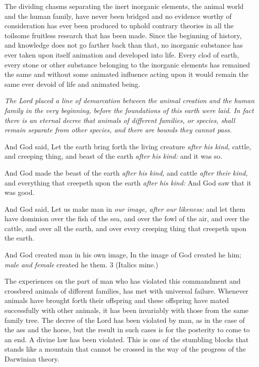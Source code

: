 The dividing chasms separating the inert inorganic elements, the animal world and the human
family, have never been bridged and no evidence worthy of consideration has ever been
produced to uphold contrary theories in all the toilsome fruitless research that has been made.
Since the beginning of history, and knowledge does not go farther back than that, no
inorganic substance has ever taken upon itself animation and developed into life. Every clod
of earth, every stone or other substance belonging to the inorganic elements has remained the
same and without some animated influence acting upon it would remain the same ever
devoid of life and animated being.

\textit{The Lord placed a line of demarcation between the animal creation and the human family in
the very beginning, before the foundations of this earth were laid. In fact there is an eternal
decree that animals of different families, or species, shall remain separate from other
species, and there are bounds they cannot pass.}

And God said, Let the earth bring forth the living creature \textit{after his kind,} cattle, and creeping
thing, and beast of the earth \textit{after his kind:} and it was so.

And God made the beast of the earth \textit{after his kind,} and cattle \textit{after their kind,} and everything
that creepeth upon the earth \textit{after his kind:} And God saw that it was good.

And God said, Let us make man in \textit{our image, after our likeness:} and let them have dominion
over the fish of the sea, and over the fowl of the air, and over the cattle, and over all the
earth, and over every creeping thing that creepeth upon the earth.

And God created man in his own image, In the image of God created he him; \textit{male and
female} created he them. 3 (Italics mine.)

The experiences on the part of man who has violated this commandment and crossbred
animals of different families, has met with universal failure. Whenever animals have brought
forth their offspring and these offspring have mated successfully with other animals, it has
been invariably with those from the same family tree. The decree of the Lord has been
violated by man, as in the case of the ass and the horse, but the result in such cases is for the
posterity to come to an end. A divine law has been violated. This is one of the stumbling
blocks that stands like a mountain that cannot be crossed in the way of the progress of the
Darwinian theory.

